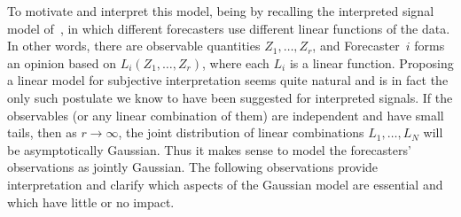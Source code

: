 \documentclass[11pt]{article}
\theoremstyle{definition}
\theoremstyle{definition}
\begin{document}
To motivate and interpret this model, being by recalling the 
interpreted signal model of~\citet{broomell2009forecasters}, in which 
different forecasters use different linear functions of the data.  
In other words, there are observable quantities $Z_1 , \ldots , Z_r$, 
and Forecaster~$i$ forms an opinion based on $L_i (Z_1 , \ldots , Z_r)$, 
where each $L_i$ is a linear function.  Proposing a linear model
for subjective interpretation seems quite natural and is in fact
the only such postulate we know to have been suggested for 
interpreted signals.
If the observables (or any linear combination of them)
are independent and have small tails, then as $r \to \infty$, the
joint distribution of linear combinations $L_1 , \ldots , L_N$
will be asymptotically Gaussian.  Thus it makes sense to model
the forecasters' observations as jointly Gaussian.  The following
observations provide interpretation and clarify which aspects of the
Gaussian model are essential and which have little or no impact.
\end{document}
